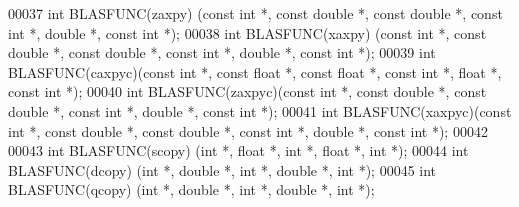 \begin{DoxyCode}
00037 \textcolor{keywordtype}{int}    BLASFUNC(zaxpy) (\textcolor{keyword}{const} \textcolor{keywordtype}{int} *, \textcolor{keyword}{const} \textcolor{keywordtype}{double} *, \textcolor{keyword}{const} \textcolor{keywordtype}{double} *, \textcolor{keyword}{const} \textcolor{keywordtype}{int} *, \textcolor{keywordtype}{double} *, \textcolor{keyword}{const} \textcolor{keywordtype}{int} *);
00038 \textcolor{keywordtype}{int}    BLASFUNC(xaxpy) (\textcolor{keyword}{const} \textcolor{keywordtype}{int} *, \textcolor{keyword}{const} \textcolor{keywordtype}{double} *, \textcolor{keyword}{const} \textcolor{keywordtype}{double} *, \textcolor{keyword}{const} \textcolor{keywordtype}{int} *, \textcolor{keywordtype}{double} *, \textcolor{keyword}{const} \textcolor{keywordtype}{int} *);
00039 \textcolor{keywordtype}{int}    BLASFUNC(caxpyc)(\textcolor{keyword}{const} \textcolor{keywordtype}{int} *, \textcolor{keyword}{const} \textcolor{keywordtype}{float}  *, \textcolor{keyword}{const} \textcolor{keywordtype}{float}  *, \textcolor{keyword}{const} \textcolor{keywordtype}{int} *, \textcolor{keywordtype}{float}  *, \textcolor{keyword}{const} \textcolor{keywordtype}{int} *);
00040 \textcolor{keywordtype}{int}    BLASFUNC(zaxpyc)(\textcolor{keyword}{const} \textcolor{keywordtype}{int} *, \textcolor{keyword}{const} \textcolor{keywordtype}{double} *, \textcolor{keyword}{const} \textcolor{keywordtype}{double} *, \textcolor{keyword}{const} \textcolor{keywordtype}{int} *, \textcolor{keywordtype}{double} *, \textcolor{keyword}{const} \textcolor{keywordtype}{int} *);
00041 \textcolor{keywordtype}{int}    BLASFUNC(xaxpyc)(\textcolor{keyword}{const} \textcolor{keywordtype}{int} *, \textcolor{keyword}{const} \textcolor{keywordtype}{double} *, \textcolor{keyword}{const} \textcolor{keywordtype}{double} *, \textcolor{keyword}{const} \textcolor{keywordtype}{int} *, \textcolor{keywordtype}{double} *, \textcolor{keyword}{const} \textcolor{keywordtype}{int} *);
00042 
00043 \textcolor{keywordtype}{int}    BLASFUNC(scopy) (\textcolor{keywordtype}{int} *, \textcolor{keywordtype}{float}  *, \textcolor{keywordtype}{int} *, \textcolor{keywordtype}{float}  *, \textcolor{keywordtype}{int} *);
00044 \textcolor{keywordtype}{int}    BLASFUNC(dcopy) (\textcolor{keywordtype}{int} *, \textcolor{keywordtype}{double} *, \textcolor{keywordtype}{int} *, \textcolor{keywordtype}{double} *, \textcolor{keywordtype}{int} *);
00045 \textcolor{keywordtype}{int}    BLASFUNC(qcopy) (\textcolor{keywordtype}{int} *, \textcolor{keywordtype}{double} *, \textcolor{keywordtype}{int} *, \textcolor{keywordtype}{double} *, \textcolor{keywordtype}{int} *);

\end{DoxyCode}
